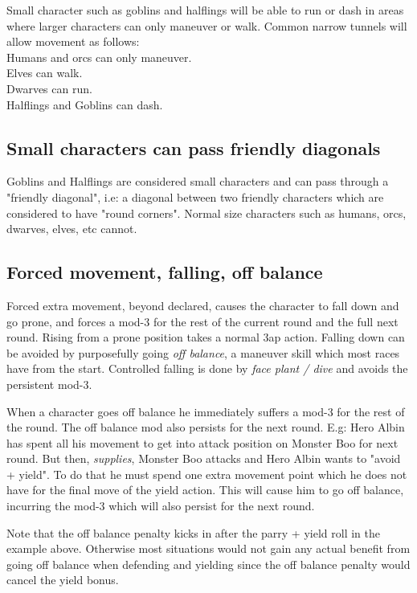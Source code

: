Small character such as goblins and halflings will be able to run or dash in areas where larger characters can only maneuver or walk. 
Common narrow tunnels will allow movement as follows: \\
Humans and orcs can only maneuver. \\
Elves can walk. \\
Dwarves can run. \\
Halflings and Goblins can dash.


\subsection*{Small characters can pass friendly diagonals}
Goblins and Halflings are considered small characters and can pass through a "friendly diagonal", i.e: a diagonal between two friendly characters which are considered to have "round corners". 
Normal size characters such as humans, orcs, dwarves, elves, etc cannot.


\subsection*{Forced movement, falling, off balance}
Forced extra movement, beyond declared, causes the character to fall down and go prone, and forces a mod-3 for the rest of the current round and the full next round. Rising from a prone position takes a normal 3ap action. Falling down can be avoided by purposefully going \emph{off balance}, a maneuver skill which most races have from the start. Controlled falling is done by \emph{face plant / dive} and avoids the persistent mod-3.

When a character goes off balance he immediately suffers a mod-3 for the rest of the round. The off balance mod also persists for the next round. E.g: Hero Albin has spent all his movement to get into attack position on Monster Boo for next round. But then, \emph{supplies}, Monster Boo attacks and Hero Albin wants to "avoid + yield". To do that he must spend one extra movement point which he does not have for the final move of the yield action. This will cause him to go off balance, incurring the mod-3 which will also persist for the next round.

Note that the off balance penalty kicks in after the parry + yield roll in the example above. Otherwise most situations would not gain any actual benefit from going off balance when defending and yielding since the off balance penalty would cancel the yield bonus.


